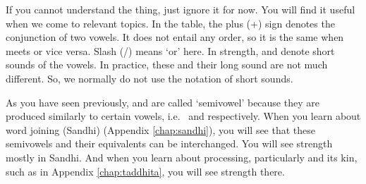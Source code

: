If you cannot understand the thing, just ignore it for now. You will find it useful when we come to relevant topics. In the table, the plus (+) sign denotes the conjunction of two vowels. It does not entail any order, so it is the same when  meets  or vice versa. Slash (/) means `or' here. In  strength,  and  denote short sounds of the vowels. In practice, these and their long sound are not much different. So, we normally do not use the notation of short sounds.

As you have seen previously,  and  are called `semivowel' because they are produced similarly to certain vowels, i.e.\  and  respectively. When you learn about word joining (Sandhi) (Appendix \ref{chap:sandhi}), you will see that these semivowels and their equivalents can be interchanged. You will see  strength mostly in Sandhi. And when you learn about  processing, particularly  and its kin, such as in Appendix \ref{chap:taddhita}, you will see  strength there.

